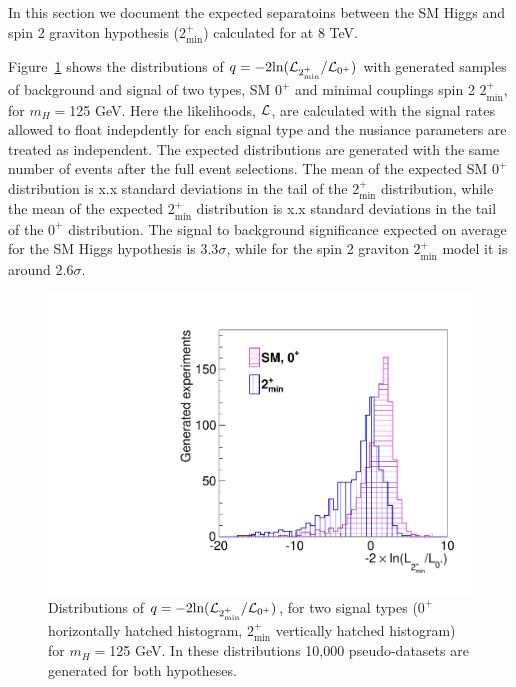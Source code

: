 In this section we document the expected separatoins between 
the SM Higgs and spin 2 graviton hypothesis ($2_\text{min}^+$) calculated for \intlumiEightTeV 
at 8 TeV.  

Figure~\ref{fig:expsep} shows the distributions of 
$q=-2\text{ln}({\cal L}_{2_\text{min}^+}/{\cal L}_{\text{0}^+})$
with generated samples of background and signal of two types, 
SM $0^+$ and minimal couplings spin 2 $2_\text{min}^+$, for $m_H=$125 GeV. 
Here the likelihoods, $\cal L$, are calculated with the signal rates 
allowed to float indepdently for each signal type and the nusiance 
parameters are treated as independent. 
The expected distributions are generated with the same number of events 
after the full event selections. 
The mean of the expected SM $0^+$ distribution is x.x standard deviations 
in the tail of the $2_\text{min}^+$ distribution, while 
the mean of the expected $2_\text{min}^+$ distribution is x.x standard deviations 
in the tail of the $0^+$ distribution. 
The signal to background significance expected on average 
for the SM Higgs hypothesis is $3.3\sigma$, while for the spin 2 graviton $2_\text{min}^+$ 
model it is around $2.6\sigma$. 

\begin{figure}[!hbtp]
\centering
\label{subfig:res}
\includegraphics[width=.45\textwidth]{figures/hypo_separation_12fb.pdf}
\caption{Distributions of 
$q=-2\text{ln}({\cal L}_{2_\text{min}^+}/{\cal L}_{\text{0}^+})$, 
for two signal types ($0^+$ horizontally hatched histogram, 
$2_\text{min}^+$ vertically hatched histogram) for $m_H=$125 GeV. 
In these distributions 10,000 pseudo-datasets are generated for 
both hypotheses. }
\label{fig:expsep}
\end{figure}
